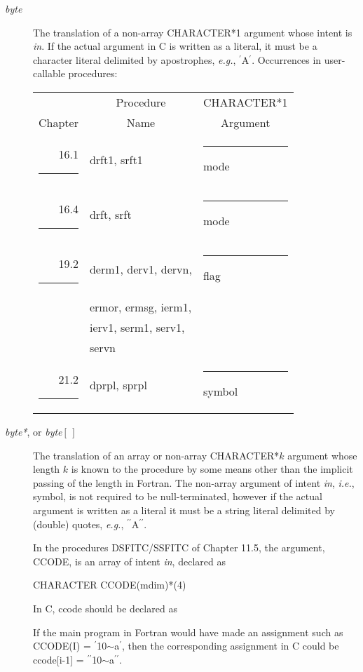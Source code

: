 \documentclass[twoside]{MATH77}
\begin{document}
\begin{description}
\item[{\em byte}\label{byte}] The translation of a non-array CHARACTER*1
argument whose intent is {\em in}.
If the actual argument in C is written as a literal, it must be a
character literal delimited by apostrophes, {\em e.g.}, $^\prime $A$^\prime $.
Occurrences in user-callable procedures:

\begin{tabular}{@{}r@{}l@{}l}
& \multicolumn{1}{c}{Procedure} & \multicolumn{1}{c}{CHARACTER*1}\\
\multicolumn{1}{c}{Chapter} & \multicolumn{1}{c}{Name} &
\multicolumn{1}{c}{Argument}\\
16.1\rule{15pt}{0pt} & drft1, srft1 & \rule{20pt}{0pt}mode\\
16.4\rule{15pt}{0pt} & drft, srft & \rule{20pt}{0pt}mode\\
19.2\rule{15pt}{0pt} & derm1, derv1, dervn, & \rule{20pt}{0pt}flag\\
& ermor, ermsg, ierm1,\\
& ierv1, serm1, serv1,\\
& servn\\
21.2\rule{15pt}{0pt} & dprpl, sprpl & \rule{20pt}{0pt}symbol
\end{tabular}

\item[{\em byte*}, or {\em byte}{$[\,]$}\label{bytestar}] The translation
of an array or non-array CHARACTER*$k$ argument whose length $k$ is known
to the procedure by some means other than the implicit passing of the
length in Fortran.  The non-array argument of intent {\em in}, {\em i.e.},
symbol, is not required to be null-terminated, however if the actual
argument is written as a literal it must be a string literal delimited by
(double) quotes, {\em e.g.}, $^{\prime \prime } $A$^{\prime \prime } $.

In the procedures DSFITC/SSFITC of Chapter 11.5, the argument, CCODE, is
an array of intent {\em in}, declared as

\hspace{.2in}CHARACTER CCODE(mdim)*(4)

In C, ccode should be declared as

\hspace{.2in}{\tt char ccode[mdim][5];}

If the main program in Fortran would have made an assignment such as CCODE(I)
= $^{\prime}$10$\sim $a$^{\prime}$, then the corresponding assignment in C
could be ccode[i-1] = $^{\prime \prime }$10$\sim $a$^{\prime \prime } $.


\end{description}
\end{document}
